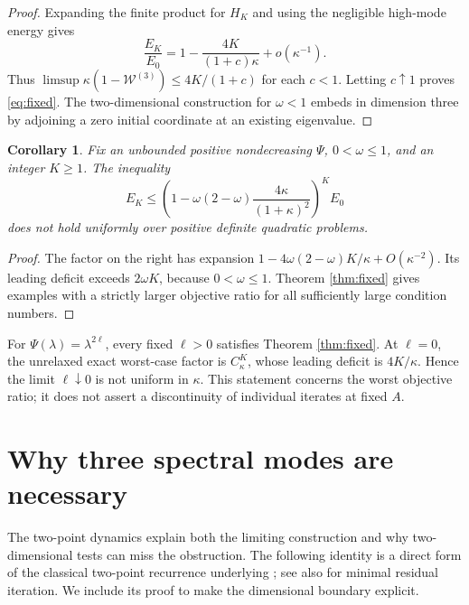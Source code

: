 \documentclass[11pt,a4paper]{article}
\newtheorem{corollary}[theorem]{Corollary}
\theoremstyle{remark}
\newcommand{\W}{\mathcal W}
\newcommand{\Ck}{C_\kappa}
\begin{document}
\begin{proof}
Expanding the finite product for $H_K$ and using the negligible high-mode energy gives
\begin{equation}\label{eq:constructionasymp}
 \frac{E_K}{E_0}=1-\frac{4K}{(1+c)\kappa}+o(\kappa^{-1}).
\end{equation}
Thus $\limsup\kappa(1-\W^{(3)})\le4K/(1+c)$ for each $c<1$. Letting $c\uparrow1$ proves \eqref{eq:fixed}. The two-dimensional construction for $\omega<1$ embeds in dimension three by adjoining a zero initial coordinate at an existing eigenvalue.
\end{proof}

\begin{corollary}\label{cor:block}
Fix an unbounded positive nondecreasing $\Psi$, $0<\omega\le1$, and an integer $K\ge1$. The inequality
\begin{equation}\label{eq:relaxedkant}
 E_K\le\left(1-\omega(2-\omega)\frac{4\kappa}{(1+\kappa)^2}\right)^K E_0
\end{equation}
does not hold uniformly over positive definite quadratic problems.
\end{corollary}
\begin{proof}
The factor on the right has expansion $1-4\omega(2-\omega)K/\kappa+O(\kappa^{-2})$. Its leading deficit exceeds $2\omega K$, because $0<\omega\le1$. Theorem \ref{thm:fixed} gives examples with a strictly larger objective ratio for all sufficiently large condition numbers.
\end{proof}

For $\Psi(\lambda)=\lambda^{2\ell}$, every fixed $\ell>0$ satisfies Theorem \ref{thm:fixed}. At $\ell=0$, the unrelaxed exact worst-case factor is $\Ck^K$, whose leading deficit is $4K/\kappa$. Hence the limit $\ell\downarrow0$ is not uniform in $\kappa$. This statement concerns the worst objective ratio; it does not assert a discontinuity of individual iterates at fixed $A$.

\section{Why three spectral modes are necessary}

The two-point dynamics explain both the limiting construction and why two-dimensional tests can miss the obstruction. The following identity is a direct form of the classical two-point recurrence underlying \cite{PWZ2006,HDLZ2022}; see also \cite[Theorem 9 and Lemma 10]{He2025} for minimal residual iteration. We include its proof to make the dimensional boundary explicit.
\end{document}
